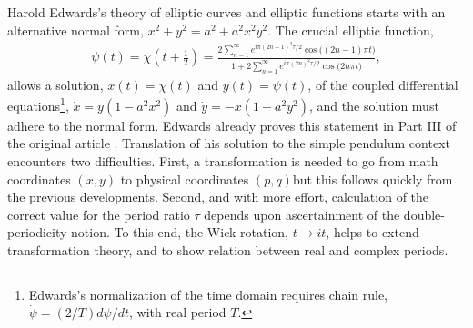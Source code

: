 \documentclass[nofootinbib,preprint]{revtex4-1}
\begin{document}
Harold Edwards's theory of elliptic curves and elliptic functions starts with an 
alternative normal form, $x^2+y^2 = a^2+a^2 x^2 y^2$. The crucial elliptic function,
\begin{eqnarray}
\psi(t)= \chi(t+\tfrac{1}{2})= \frac{2\sum_{n=1}^{\infty}e^{i \pi(2n-1)^2 \tau/2}\cos\big((2 n-1)\pi t \big) 
}{1+2\sum_{n=1}^{\infty} e^{i \pi(2n)^2 \tau/2}\cos\big(2 n \pi t \big)},\nonumber
\end{eqnarray}
allows a solution, $x(t)=\chi(t)$ and $y(t)=\psi(t)$, of the coupled differential 
equations\footnote{Edwards's normalization of the time domain requires chain rule, 
$\dot{\psi}=(2/T) d\psi/dt  $, with real period $T$.}, ${\dot{x}=y(1-a^2 x^2)}$ and 
$\dot{y}=-x(1-a^2 y^2)$, and the solution must adhere to the normal form. Edwards already 
proves this statement in Part III of the original article \cite{EDWARDS2007}. 
Translation of his solution to the simple pendulum context encounters two difficulties. 
First, a  transformation is needed to go from math coordinates $(x,y)$ to physical coordinates 
$(p,q)$\textemdash but this follows quickly from the previous developments. Second,
and with more effort, calculation of the correct value for the period ratio $\tau$ 
depends upon ascertainment of the double-periodicity notion. To this end, the Wick rotation, 
$t \rightarrow i t$, helps to extend transformation theory,
and to show relation between real and complex periods. 
\end{document}
